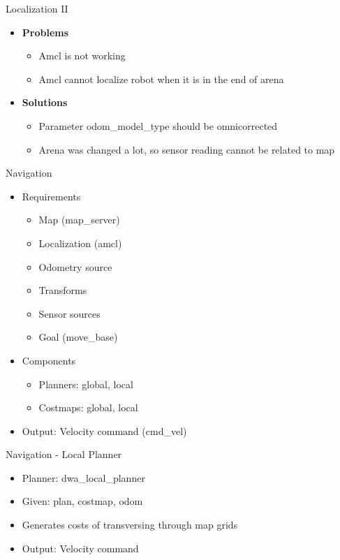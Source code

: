 \begin{frame}{Localization II}
\begin{itemize}
\item \textbf{Problems}
    \begin{itemize}
    \item Amcl is not working
    \item Amcl cannot localize robot when it is in the end of arena
    \end{itemize}
\item \textbf{Solutions}
	\begin{itemize}
	\item Parameter odom\_model\_type should be omni\-corrected
	\item Arena was changed a lot, so sensor reading cannot be related to map
	\end{itemize}
\end{itemize}
\end{frame}
\begin{frame}{Navigation}
\begin{itemize}
	\item Requirements
		\begin{itemize}
			\item Map (map\_server)
			\item Localization (amcl)
			\item Odometry source
			\item Transforms
			\item Sensor sources
			\item Goal (move\_base) 
		\end{itemize}
	\item Components
		\begin{itemize}
			\item Planners: global, local
			\item Costmaps: global, local
		\end{itemize}
	\item Output: Velocity command (cmd\_vel)
\end{itemize}
\end{frame}
\begin{frame}{Navigation - Local Planner}
\begin{itemize}
	\item Planner: dwa\_local\_planner
	\item Given: plan, costmap, odom
	\item Generates costs of transversing through map grids
	\item Output: Velocity command
\end{itemize}
\end{frame}
